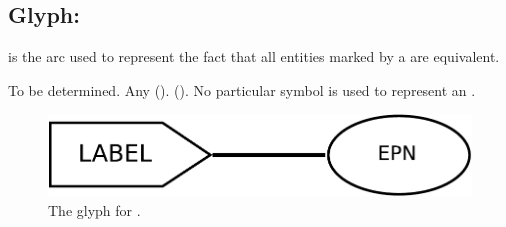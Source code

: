 \subsection{Glyph:  }\label{sec:equivalenceArc}

 is the arc used to represent the fact that all entities
marked by a  are equivalent. 

\begin{glyphDescription}
 \glyphSboTerm To be determined.
 \glyphOrigin Any  ().
 \glyphTarget {} ().
 \glyphEndPoint No particular symbol is used to represent an .
 \end{glyphDescription}

\begin{figure}[H]
  \centering
  \includegraphics[scale = 0.4]{images/equivalence}
  \caption{The \PD glyph for .}
  \label{fig:equivalence}
\end{figure}
